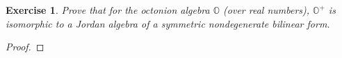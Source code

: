 \documentclass{article}
\newtheorem{exercise}[theorem]{Exercise}
\begin{document}
\begin{exercise}
Prove that for the octonion algebra $\mathbb{O}$ (over real numbers), $\mathbb{O}^+$ is isomorphic to a Jordan algebra of a symmetric nondegenerate bilinear form.  
\end{exercise}

\begin{proof} 

\end{proof}



\end{document}

